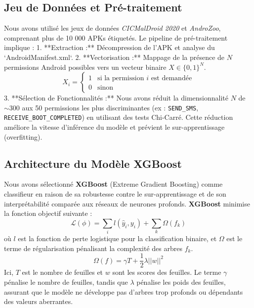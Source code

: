 \documentclass[
  journal=largetwo,
  manuscript=article-type,
  year=2025,
  volume=1,
]{cup-journal}
\begin{document}
\subsection{Jeu de Données et Pré-traitement}
Nous avons utilisé les jeux de données \textit{CICMalDroid 2020} et \textit{AndroZoo}, comprenant plus de 10 000 APKs étiquetés. Le pipeline de pré-traitement implique :
1.  **Extraction :** Décompression de l'APK et analyse du `AndroidManifest.xml`.
2.  **Vectorisation :** Mappage de la présence de $N$ permissions Android possibles vers un vecteur binaire $X \in \{0, 1\}^N$.
    \[
    X_i = \begin{cases} 
    1 & \text{si la permission } i \text{ est demandée} \\
    0 & \text{sinon}
    \end{cases}
    \]
3.  **Sélection de Fonctionnalités :** Nous avons réduit la dimensionnalité $N$ de $\sim$300 aux 50 permissions les plus discriminantes (ex : \texttt{SEND\_SMS}, \texttt{RECEIVE\_BOOT\_COMPLETED}) en utilisant des tests Chi-Carré. Cette réduction améliore la vitesse d'inférence du modèle et prévient le sur-apprentissage (overfitting).

\subsection{Architecture du Modèle XGBoost}
Nous avons sélectionné \textbf{XGBoost} (Extreme Gradient Boosting) comme classifieur en raison de sa robustesse contre le sur-apprentissage et de son interprétabilité comparée aux réseaux de neurones profonds. \textbf{XGBoost} minimise la fonction objectif suivante :
\begin{equation}
\mathcal{L}(\phi) = \sum_{i} l(\hat{y}_i, y_i) + \sum_{k} \Omega(f_k)
\end{equation}
où $l$ est la fonction de perte logistique pour la classification binaire, et $\Omega$ est le terme de régularisation pénalisant la complexité des arbres $f_k$.
\[
\Omega(f) = \gamma T + \frac{1}{2}\lambda ||w||^2
\]
Ici, $T$ est le nombre de feuilles et $w$ sont les scores des feuilles. Le terme $\gamma$ pénalise le nombre de feuilles, tandis que $\lambda$ pénalise les poids des feuilles, assurant que le modèle ne développe pas d'arbres trop profonds ou dépendants des valeurs aberrantes.
\end{document}
